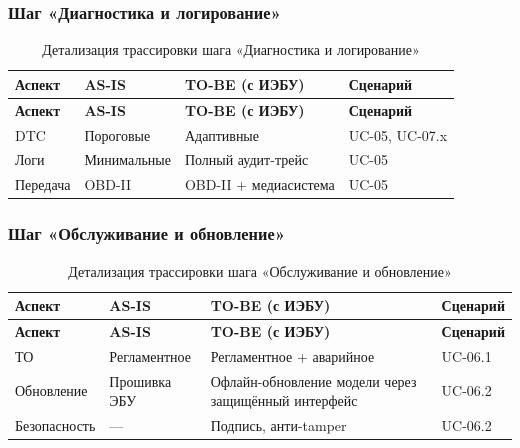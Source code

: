 \documentclass[14pt, a4paper]{extarticle}
\begin{document}
				\subsubsection{Шаг «Диагностика и логирование»}
				
				{\fontsize{9}{11}\selectfont
					\begin{xltabular}{\textwidth}{|L|L|L|L|}
					\caption{Детализация трассировки шага «Диагностика и логирование»}\label{tab:trace-diagnostics}\\
					\hline
					\textbf{Аспект} & \textbf{AS-IS} & \textbf{TO-BE (с ИЭБУ)} & \textbf{Сценарий} \\
					\hline
					\endfirsthead
					\hline
					\textbf{Аспект} & \textbf{AS-IS} & \textbf{TO-BE (с ИЭБУ)} & \textbf{Сценарий} \\
					\hline
					\endhead
					\hline
					\endfoot
					\hline
					\endlastfoot
					DTC & Пороговые & Адаптивные & UC-05, UC-07.x \\
					\hline
					Логи & Минимальные & Полный аудит-трейс & UC-05 \\
					\hline
					Передача & OBD-II & OBD-II + медиасистема & UC-05 \\
					\hline
				\end{xltabular}}
				
				\subsubsection{Шаг «Обслуживание и обновление»}
				
				{\fontsize{9}{11}\selectfont
					\begin{xltabular}{\textwidth}{|L|L|L|L|}
					\caption{Детализация трассировки шага «Обслуживание и обновление»}\label{tab:trace-maintenance}\\
					\hline
					\textbf{Аспект} & \textbf{AS-IS} & \textbf{TO-BE (с ИЭБУ)} & \textbf{Сценарий} \\
					\hline
					\endfirsthead
					\hline
					\textbf{Аспект} & \textbf{AS-IS} & \textbf{TO-BE (с ИЭБУ)} & \textbf{Сценарий} \\
					\hline
					\endhead
					\hline
					\endfoot
					\hline
					\endlastfoot
					ТО & Регламентное & Регламентное + аварийное & UC-06.1 \\
					\hline
					Обновление & Прошивка ЭБУ & Офлайн-обновление модели через защищённый интерфейс & UC-06.2 \\
					\hline
					Безопасность & — & Подпись, анти-tamper & UC-06.2 \\
					\hline
				\end{xltabular}}
				
\end{document}
